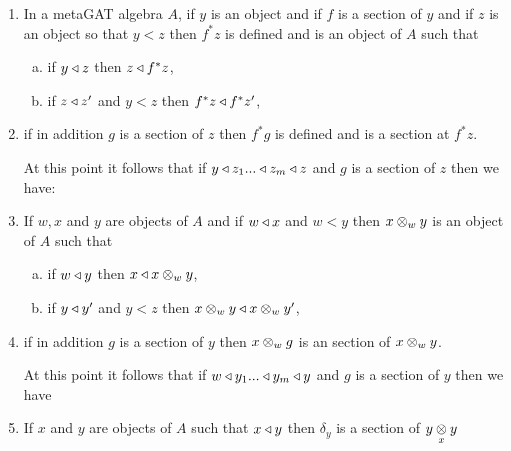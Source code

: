 \documentclass[10pt,a4paper]{article}
\begin{document}
\begin{enumerate}
\item In a metaGAT algebra $A$, if $y$ is an object and if $f$ is a section of $y$ and if $z$ is an object so that $y < z$ then $f^*z$ is defined and is an object of $A$ 
      such that 
			\begin{enumerate}[(a)]
			\item if $y \base z$ then $z \base f^*z$,
			\item if $z \base z'$ and $y <z$ then $f^*z \base f^*z'$,
			\end{enumerate}
\item if in addition $g$ is a section of $z$ then $f^*g$ is defined and is a section at $f^*z$. 

At this point it follows that if $y \base z_1 ... \base z_m \base z$ and $g$ is a section of $z$ then we have:

 

\item If $w,x$ and $y$ are objects of $A$  and if $w \base x$ and $w < y$ then $x \cross_w y$ is an object of $A$ 
such that
    \begin{enumerate}[(a)]
		\item if $w \base y$ then $x \base x \cross_w y$,
		\item if $y \base y'$ and $y <z$ then $x \cross_w y \base x \cross_w y'$,
		\end{enumerate}
\item if in addition $g$ is a section of $y$ then $x \cross_w g$ is an section of $x \cross_w y$.

At this point it follows that if $w \base y_1 ... \base y_m \base y$ and $g$ is a section of $y$ then we have

\vspace{0.5cm}
\item If $x$ and $y$ are objects of $A$ such that $x \base y$ then $\delta_y$ is a section of $\crossx{y}{y}{x}$
\vspace{0.5cm}
 
\end{enumerate}
\end{document}
